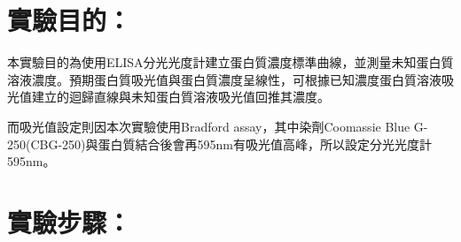 \setlength{\parindent}{2em} %

\section*{實驗目的：}
本實驗目的為使用ELISA分光光度計建立蛋白質濃度標準曲線，並測量未知蛋白質溶液濃度。預期蛋白質吸光值與蛋白質濃度呈線性，可根據已知濃度蛋白質溶液吸光值建立的迴歸直線與未知蛋白質溶液吸光值回推其濃度。

而吸光值設定則因本次實驗使用Bradford assay，其中染劑Coomassie Blue G-250(CBG-250)與蛋白質結合後會再595nm有吸光值高峰，所以設定分光光度計595nm。

\section*{實驗步驟：}


